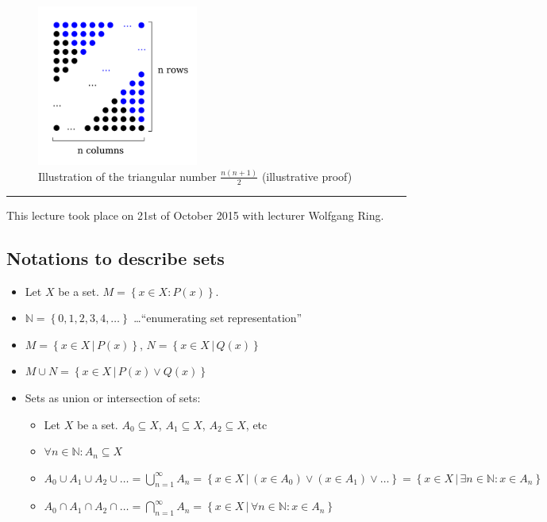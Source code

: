 \documentclass[a4paper,landscape,twocolumn]{article}
\theoremstyle{definition}
\newcommand\set[1]{\left\{#1\right\}}
\newcommand\setdef[2]{\left\{#1\,|\,#2\right\}}
\newcommand\meta[3]{\hrule{} This #1 took place on #2 with lecturer #3.\par}
\begin{document}
\begin{figure}[!h]
  \begin{center}
    \includegraphics[width=200px]{img/triangular_number.pdf}
    \caption{Illustration of the triangular number $\frac{n (n+1)}{2}$ (illustrative proof)}
  \end{center}
\end{figure}

\meta{lecture}{21st of October 2015}{Wolfgang Ring}

\subsection{Notations to describe sets}

\begin{itemize}
  \item Let $X$ be a set. $M = \set{x \in X: P(x)}$.
  \item $\mathbb N = \set{0,1,2,3,4, \dots}$ \dots \enquote{enumerating set representation}
  \item $M = \setdef{x \in X}{P(x)}$, $N = \setdef{x \in X}{Q(x)}$
  \item $M \cup N = \setdef{x \in X}{P(x) \lor Q(x)}$
  \item Sets as union or intersection of sets:
    \begin{itemize}
      \item Let $X$ be a set. $A_0 \subseteq X$, $A_1 \subseteq X$, $A_2 \subseteq X$, etc
      \item $\forall n \in \mathbb N: A_n \subseteq X$
      \item $A_0 \cup A_1 \cup A_2 \cup \dots = \bigcup_{n=1}^\infty A_{n} = \setdef{x \in X}{(x \in A_0) \lor (x \in A_1) \lor \dots} = \setdef{x \in X}{\exists n \in \mathbb N: x \in A_n}$
      \item $A_0 \cap A_1 \cap A_2 \cap \dots = \bigcap_{n=1}^\infty A_n = \setdef{x \in X}{\forall n \in \mathbb N: x \in A_n}$
    \end{itemize}
\end{itemize}
\end{document}

